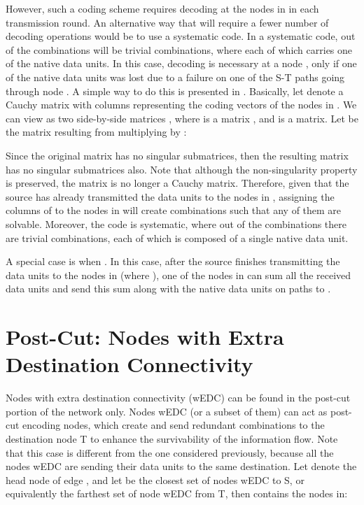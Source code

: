 \documentclass[conference]{IEEEtran}
\begin{document}
However, such a coding scheme requires decoding at the nodes in  in each transmission round. An alternative way that will require a fewer number of decoding operations would be to use a systematic code. In a systematic code,  out of the  combinations will be trivial combinations, where each of which carries one of the  native data units. In this case, decoding is necessary at a node , only if one of the native data units was lost due to a failure on one of the  S-T paths going through node . A simple way to do this is presented in \cite{JJ03}. Basically, let  denote a  Cauchy matrix with columns representing the coding vectors of the nodes in . We can view  as two side-by-side matrices , where  is a  matrix , and  is a  matrix. Let  be the  matrix resulting from multiplying   by :



Since the original matrix  has no singular submatrices, then the resulting matrix  has no singular submatrices also. Note that although the non-singularity property is preserved, the matrix is no longer a Cauchy matrix. Therefore, given that the source has already transmitted the  data units to the nodes in , assigning the columns of  to the nodes in  will create  combinations such that any  of them are solvable. Moreover, the code is systematic, where out of the  combinations there are  trivial combinations, each of which is composed of a single native data unit. 

A special case is when . In this case, after the source finishes transmitting the  data units to the nodes in  (where ), one of the nodes in  can sum all the received data units and send this sum along with the  native data units on  paths to . 













\section{Post-Cut: Nodes with Extra Destination Connectivity}
\label{Sec:postCut}

Nodes with extra destination connectivity (wEDC) can be found in the post-cut portion of the network only. Nodes wEDC (or a subset of them) can act as post-cut encoding nodes, which create and send redundant combinations to the destination node T to enhance the survivability of the information flow. Note that this case is different from the one considered previously, because all the nodes wEDC are sending their data units to the same destination. Let  denote the head node of edge , and let  be the closest set of nodes wEDC to S, or equivalently the farthest set of node wEDC from T, then  contains the nodes in:
\end{document}
